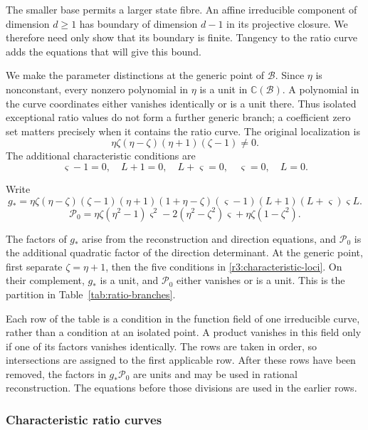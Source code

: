 \documentclass[11pt,a4paper]{article}
\numberwithin{equation}{section}
\theoremstyle{plain}
\theoremstyle{definition}
\theoremstyle{remark}
\begin{document}
The smaller base permits a larger state fibre. An affine
irreducible component of dimension $d\ge1$ has boundary of
dimension $d-1$ in its projective closure. We therefore need only
show that its boundary is finite. Tangency to the ratio curve
adds the equations that will give this bound.

We make the parameter distinctions at the generic point of
$\mathscr B$. Since $\eta$ is nonconstant, every nonzero polynomial
in $\eta$ is a unit in $\mathbb C(\mathscr B)$. A polynomial in the
curve coordinates either vanishes identically or is a unit there.
Thus isolated exceptional ratio values do not form a further
generic branch; a coefficient zero set matters precisely when it
contains the ratio curve. The original localization is
\[
 \eta\zeta(\eta-\zeta)(\eta+1)(\zeta-1)\ne0.
\]
The additional characteristic conditions are
\begin{equation}\label{r3:characteristic-loci}
 \varsigma-1=0,\quad L+1=0,\quad L+\varsigma=0,\quad
 \varsigma=0,\quad L=0.
\end{equation}

Write
\[
 g_*=\eta\zeta(\eta-\zeta)(\zeta-1)(\eta+1)(1+\eta-\zeta)
       (\varsigma-1)(L+1)(L+\varsigma)\varsigma L.
\]
\begin{equation}\label{r3:quadratic-factor}
 \mathcal P_0=
 \eta\zeta(\eta^2-1)\varsigma^2
 -2(\eta^2-\zeta^2)\varsigma+\eta\zeta(1-\zeta^2).
\end{equation}

The factors of $g_*$ arise from the reconstruction and direction
equations, and $\mathcal P_0$ is the additional quadratic factor
of the direction determinant. At the generic point, first separate
$\zeta=\eta+1$, then the five conditions in
\eqref{r3:characteristic-loci}. On their complement, $g_*$ is a
unit, and $\mathcal P_0$ either vanishes or is a unit. This is the
partition in Table~\ref{tab:ratio-branches}.

Each row of the table is a condition in the function field of
one irreducible curve, rather than a condition at an isolated
point. A product vanishes in this field only if one of its factors
vanishes identically. The rows are taken in order, so intersections
are assigned to the first applicable row. After these rows have
been removed, the factors in $g_*\mathcal P_0$ are units and may
be used in rational reconstruction. The equations before those
divisions are used in the earlier rows.

\subsubsection{Characteristic ratio curves}
\end{document}
